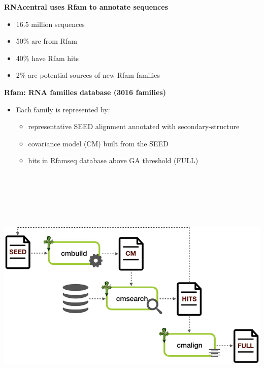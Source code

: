 \documentclass[landscape]{slides}
\begin{document}
\begin{slide}
\begin{center}

\textbf{RNAcentral uses Rfam to annotate sequences}

\begin{itemize}
\item 16.5 million sequences
\item 50\% are from Rfam
\item 40\% have Rfam hits
\item  2\% are potential sources of new Rfam families
\end{itemize}

\end{center}
\vfill
\end{slide}
\begin{slide}
\begin{center}
\textbf{Rfam: RNA families database (3016 families)}

\small
\begin{itemize}
\item Each family is represented by:
  \begin{itemize}
  \item representative SEED alignment annotated with secondary-structure
  \item covariance model (CM) built from the SEED
  \item hits in Rfamseq database above GA threshold (FULL)
  \end{itemize}
\end{itemize}

\vspace{0.5in}
\includegraphics[height=5in]{figs/kalvari18-rfam-schema}

\vfill

\end{center}
\end{slide}
\end{document}
